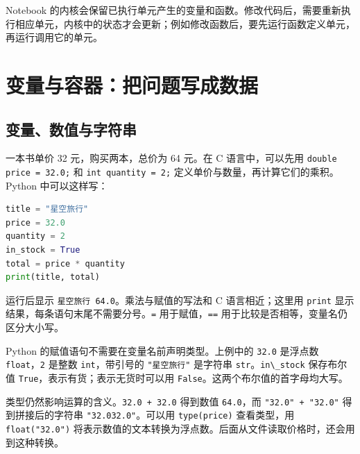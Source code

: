 \documentclass[UTF8,a4paper,11pt,fontset=fandol]{ctexart}
\providecommand{\passthrough}[1]{#1}
\begin{document}
Notebook 的内核会保留已执行单元产生的变量和函数。修改代码后，需要重新执行相应单元，内核中的状态才会更新；例如修改函数后，要先运行函数定义单元，再运行调用它的单元。

\clearpage

\section{变量与容器：把问题写成数据}\label{ux53d8ux91cfux4e0eux5bb9ux5668ux628aux95eeux9898ux5199ux6210ux6570ux636e}

\subsection{变量、数值与字符串}\label{ux53d8ux91cfux6570ux503cux4e0eux5b57ux7b26ux4e32}

一本书单价 32 元，购买两本，总价为 64 元。在 C 语言中，可以先用 \passthrough{\lstinline!double price = 32.0;!} 和 \passthrough{\lstinline!int quantity = 2;!} 定义单价与数量，再计算它们的乘积。Python 中可以这样写：

\begin{lstlisting}[language=Python]
title = "星空旅行"
price = 32.0
quantity = 2
in_stock = True
total = price * quantity
print(title, total)
\end{lstlisting}

运行后显示 \passthrough{\lstinline!星空旅行 64.0!}。乘法与赋值的写法和 C 语言相近；这里用 \passthrough{\lstinline!print!} 显示结果，每条语句末尾不需要分号。\passthrough{\lstinline!=!} 用于赋值，\passthrough{\lstinline!==!} 用于比较是否相等，变量名仍区分大小写。

Python 的赋值语句不需要在变量名前声明类型。上例中的 \passthrough{\lstinline!32.0!} 是浮点数 \passthrough{\lstinline!float!}，\passthrough{\lstinline!2!} 是整数 \passthrough{\lstinline!int!}，带引号的 \passthrough{\lstinline!"星空旅行"!} 是字符串 \passthrough{\lstinline!str!}。\passthrough{\lstinline!in\_stock!} 保存布尔值 \passthrough{\lstinline!True!}，表示有货；表示无货时可以用 \passthrough{\lstinline!False!}。这两个布尔值的首字母均大写。

类型仍然影响运算的含义。\passthrough{\lstinline!32.0 + 32.0!} 得到数值 \passthrough{\lstinline!64.0!}，而 \passthrough{\lstinline!"32.0" + "32.0"!} 得到拼接后的字符串 \passthrough{\lstinline!"32.032.0"!}。可以用 \passthrough{\lstinline!type(price)!} 查看类型，用 \passthrough{\lstinline!float("32.0")!} 将表示数值的文本转换为浮点数。后面从文件读取价格时，还会用到这种转换。
\end{document}
